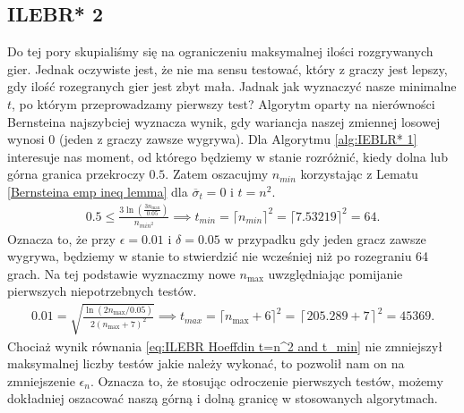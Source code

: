 \documentclass[inzynierska]{pwr_wmat_praca_dyplomowa}
\theoremstyle{plain}
\numberwithin{theorem}{chapter}
\theoremstyle{definition}
\numberwithin{theorem}{chapter}
\newcommand{\nmax}{n_{\text{max}}}
\begin{document}
	\subsection{ILEBR* 2}
	Do tej pory skupialiśmy się na ograniczeniu maksymalnej ilości rozgrywanych gier. Jednak oczywiste jest, że nie ma sensu testować, który z graczy jest lepszy, gdy ilość rozegranych gier jest zbyt mała. Jadnak jak wyznaczyć nasze minimalne $t$, po którym przeprowadzamy pierwszy test? Algorytm oparty na nierówności Bernsteina najszybciej wyznacza wynik, gdy wariancja naszej zmiennej losowej wynosi 0 (jeden z graczy zawsze wygrywa). Dla Algorytmu \ref{alg:IEBLR* 1} interesuje nas moment, od którego będziemy w stanie rozróżnić, kiedy dolna lub górna granica przekroczy $0.5$. Zatem oszacujmy $n_{min}$ korzystając z Lematu \ref{Bernsteina emp ineq lemma} dla $\overline{\sigma}_t=0$ i $t = n^2$.
	\begin{gather*}
		\label{eq:ILEBR Bernstein t=n^2}
		0.5 \le \frac{3  \ln(\frac{3\nmax}{0.05})}{n_{min^2}}\implies t_{min} = \lceil n_{min} \rceil^2 = \lceil7.53219\rceil^2= 64. 
	\end{gather*}
	Oznacza to, że przy $\epsilon = 0.01$ i $\delta = 0.05$ w przypadku gdy jeden gracz zawsze wygrywa, będziemy w stanie to stwierdzić nie wcześniej niż po rozegraniu 64 grach.
	Na tej podstawie wyznaczmy nowe $\nmax$ uwzględniając pomijanie pierwszych niepotrzebnych testów.
	\begin{gather}
		\label{eq:ILEBR Hoeffdin t=n^2 and t_min}
		0.01 =  \sqrt{\frac{\ln(2\nmax/0.05)}{2(\nmax+7)^2}} \implies t_{max} = \lceil \nmax+6\rceil^2 = \left\lceil 205.289+7\right\rceil^2= 45369.
	\end{gather}
	Chociaż wynik równania \eqref{eq:ILEBR Hoeffdin t=n^2 and t_min} nie zmniejszył maksymalnej liczby testów jakie należy wykonać, to pozwolił nam on na zmniejszenie $\epsilon_n$. Oznacza to, że stosując odroczenie pierwszych testów, możemy dokładniej oszacować naszą górną i dolną granicę w stosowanych algorytmach.
\end{document}
